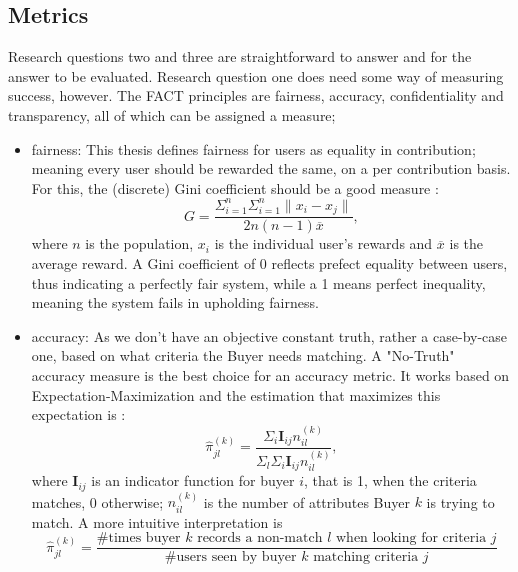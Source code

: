 \documentclass[a4paper,11pt]{report} %
\theoremstyle{change}
\theoremstyle{theoremstyle}
\begin{document}
\subsection{Metrics}
Research questions two and three are straightforward to answer and for the answer to be evaluated. Research question one does need some way of measuring success, however. The FACT principles are fairness, accuracy, confidentiality and transparency, all of which can be assigned a measure;
\begin{itemize}
    \item fairness: This thesis defines fairness for users as equality in contribution; meaning every user should be rewarded the same, on a per contribution basis. For this, the (discrete) Gini coefficient should be a good measure \cite{RePEc:oxp:obooks:9780198281931}: %
    \begin{equation*}
     G = \frac{\Sigma^{n}_{i=1}\Sigma^{n}_{i=1}\| x_i-x_j \|}{2n(n-1)\overline{x}},   
    \end{equation*}
    where $n$ is the population, $x_i$ is the individual user's rewards and $\overline{x}$ is the average reward. A Gini coefficient of 0 reflects prefect equality between users, thus indicating a perfectly fair system, while a 1 means perfect inequality, meaning the system fails in upholding fairness.
    \item accuracy: As we don't have an objective constant truth, rather a case-by-case one, based on what criteria the Buyer needs matching. A "No-Truth" accuracy measure is the best choice for an accuracy metric. It works based on Expectation-Maximization and the estimation that maximizes this expectation is \cite{dawid1979maximum}: %
    \begin{equation*}
        \hat{\pi}^{(k)}_{jl} = \frac{\Sigma_i \mathbf{I}_{ij} n^{(k)}_{il}}{\Sigma_l \Sigma_i \mathbf{I}_{ij}n^{(k)}_{il}},   
    \end{equation*}
    where $\mathbf{I}_{ij}$ is an indicator function for buyer $i$, that is 1, when the criteria matches, 0 otherwise; $n^{(k)}_{il}$ is the number of attributes Buyer $k$ is trying to match.
    A more intuitive interpretation is 
    \begin{equation*}
        \hat{\pi}^{(k)}_{jl} = \frac{\text{\# times buyer $k$ records a non-match $l$ when looking for criteria $j$}}{\text{\# users seen by buyer $k$ matching criteria $j$}}

\end{equation*}
\end{itemize}
\end{document}
